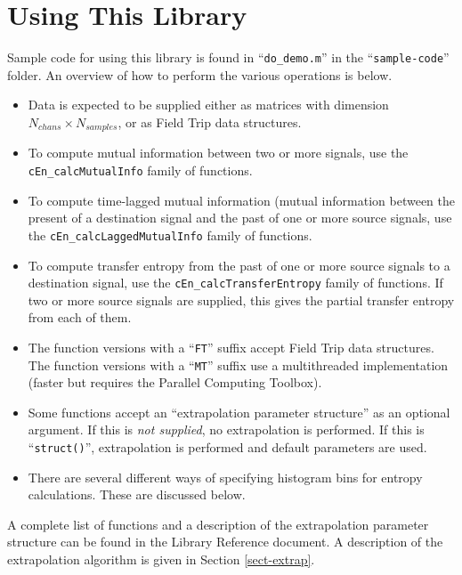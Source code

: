
\chapter{Using This Library}
\label{sect-howto}

Sample code for using this library is found in ``\verb|do_demo.m|'' in the
``\verb|sample-code|'' folder. An overview of how to perform the various
operations is below.
%
\begin{itemize}
%
\item Data is expected to be supplied either as matrices with dimension
$N_{chans} \times N_{samples}$, or as Field Trip data structures.
%
\item To compute mutual information between two or more signals, use the
\verb|cEn_calcMutualInfo| family of functions.
%
\item To compute time-lagged mutual information (mutual information between
the present of a destination signal and the past of one or more source
signals, use the \verb|cEn_calcLaggedMutualInfo| family of functions.
%
\item To compute transfer entropy from the past of one or more source
signals to a destination signal, use the \verb|cEn_calcTransferEntropy|
family of functions. If two or more source signals are supplied, this gives
the partial transfer entropy from each of them.
%
\item The function versions with a ``\verb|FT|'' suffix accept Field Trip
data structures. The function versions with a ``\verb|MT|'' suffix use a
multithreaded implementation (faster but requires the Parallel Computing
Toolbox).
%
\item Some functions accept an ``extrapolation parameter structure'' as an
optional argument. If this is \textit{not supplied}, no extrapolation is
performed. If this is ``\verb|struct()|'', extrapolation is performed and
default parameters are used.
%
\item There are several different ways of specifying histogram bins for
entropy calculations. These are discussed below.
%
\end{itemize}

A complete list of functions and a description of the extrapolation
parameter structure can be found in the Library Reference document. A
description of the extrapolation algorithm is given in Section
\ref{sect-extrap}.

